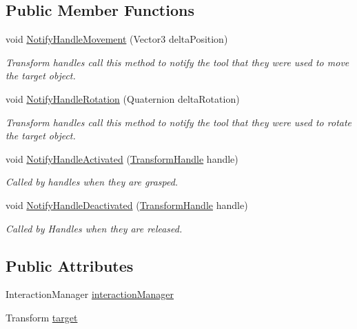 \subsection*{Public Member Functions}
\begin{DoxyCompactItemize}
\item 
void \mbox{\hyperlink{class_leap_1_1_unity_1_1_examples_1_1_transform_tool_a96a30f1c6f857af4f841608a41e5488d}{Notify\+Handle\+Movement}} (Vector3 delta\+Position)
\begin{DoxyCompactList}\small\item\em Transform handles call this method to notify the tool that they were used to move the target object. \end{DoxyCompactList}\item 
void \mbox{\hyperlink{class_leap_1_1_unity_1_1_examples_1_1_transform_tool_a3c43fb470f2e6fcaadfbf05aba33d8ca}{Notify\+Handle\+Rotation}} (Quaternion delta\+Rotation)
\begin{DoxyCompactList}\small\item\em Transform handles call this method to notify the tool that they were used to rotate the target object. \end{DoxyCompactList}\item 
void \mbox{\hyperlink{class_leap_1_1_unity_1_1_examples_1_1_transform_tool_ad4aa45ec03040ccc6d3b8006c65d212b}{Notify\+Handle\+Activated}} (\mbox{\hyperlink{class_leap_1_1_unity_1_1_examples_1_1_transform_handle}{Transform\+Handle}} handle)
\begin{DoxyCompactList}\small\item\em Called by handles when they are grasped. \end{DoxyCompactList}\item 
void \mbox{\hyperlink{class_leap_1_1_unity_1_1_examples_1_1_transform_tool_a87a50c5f1fe21f8f9d28caa545256366}{Notify\+Handle\+Deactivated}} (\mbox{\hyperlink{class_leap_1_1_unity_1_1_examples_1_1_transform_handle}{Transform\+Handle}} handle)
\begin{DoxyCompactList}\small\item\em Called by Handles when they are released. \end{DoxyCompactList}\end{DoxyCompactItemize}
\subsection*{Public Attributes}
\begin{DoxyCompactItemize}
\item 
Interaction\+Manager \mbox{\hyperlink{class_leap_1_1_unity_1_1_examples_1_1_transform_tool_a1f8ec4a33ca6ea96981de9df4eaa2088}{interaction\+Manager}}
\item 
Transform \mbox{\hyperlink{class_leap_1_1_unity_1_1_examples_1_1_transform_tool_a51bd483e751697c0141bb388a254f655}{target}}
\end{DoxyCompactItemize}


